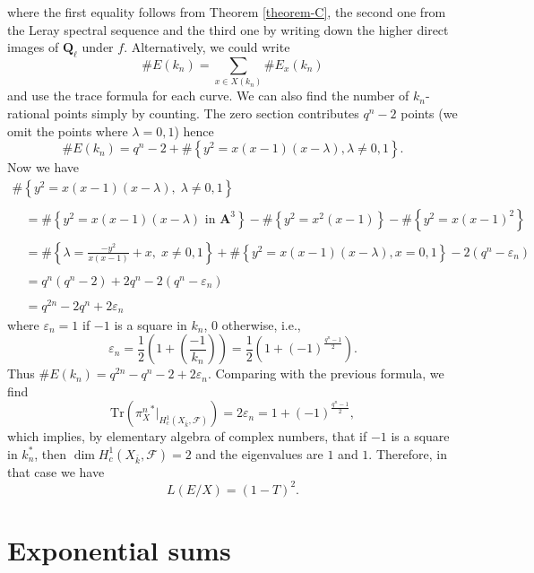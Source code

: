 where the first equality follows from
Theorem \ref{theorem-C},
the second one from
the Leray spectral sequence and the third one by writing down the higher direct
images of $\mathbf{Q}_\ell$ under $f$. Alternatively, we could write
$$
\#E(k_n) = \sum_{x \in X(k_n)} \#E_x(k_n)
$$
and use the trace formula for each curve. We can also find the number of
$k_n$-rational points simply by counting. The zero section contributes $q^n -2$
points (we omit the points where $\lambda = 0, 1$) hence
$$
\# E(k_n) =
q^n-2 + \#\left\{y^2 = x(x-1)(x-\lambda), \lambda\neq 0, 1\right\}.
$$
Now we have
$$
\begin{matrix}
\#\left\{y^2 = x(x-1)(x-\lambda), \; \lambda\neq 0, 1\right\}\\
\\
\quad = \#\left\{y^2 = x(x-1)(x-\lambda)\text{ in }\mathbf{A}^3\right\}
-\#\left\{y^2 = x^2(x-1)\right\}-\#\left\{y^2 = x(x-1)^2\right\}\\
\\
\quad = \#\left\{\lambda=\frac{-y^2}{x(x-1)}+x, \; x\neq 0, 1\right\} +
\#\left\{y^2 = x(x-1)(x-\lambda), x=0, 1\right\}-2(q^n-\varepsilon_n) \\
\\
\quad = q^n(q^n-2)+2q^n-2(q^n-\varepsilon_n)\\
\\
\quad = q^{2n}-2q^n+2\varepsilon_n
\end{matrix}
$$
where $\varepsilon_n = 1$ if $-1$ is a square in $k_n$, 0 otherwise,
i.e.,
$$
\varepsilon_n = \frac{1}{2}\left(1+\left(\frac{-1}{k_n}\right)\right) =
\frac{1}{2}\left(1+(-1)^{\frac{q^n-1}{2}}\right).
$$
Thus $ \# E(k_n) = q^{2n}-q^n-2+ 2\varepsilon_n$. Comparing with the previous
formula, we find
$$
\text{Tr}\left({\pi_X^n}^*\big|_{H_c^1(X_{\bar k}, \mathcal{F})}\right) = 2
\varepsilon_n = 1+(-1)^{\frac{q^n-1}{2}},
$$
which implies, by elementary algebra of complex numbers, that if $-1$ is a
square in $k_n^*$, then $\dim H_c^1(X_{\bar k}, \mathcal{F}) = 2$ and the
eigenvalues are $1$ and $1$. Therefore, in that case we have
$$
L(E/X) = (1-T)^2.
$$




\section{Exponential sums}
\label{section-exponential-sums}

